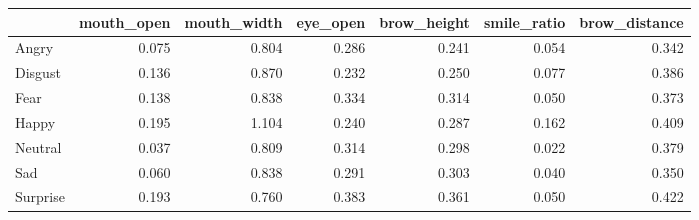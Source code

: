 \begin{tabular}{lrrrrrr}
\toprule
 & mouth_open & mouth_width & eye_open & brow_height & smile_ratio & brow_distance \\
\midrule
Angry & 0.075 & 0.804 & 0.286 & 0.241 & 0.054 & 0.342 \\
Disgust & 0.136 & 0.870 & 0.232 & 0.250 & 0.077 & 0.386 \\
Fear & 0.138 & 0.838 & 0.334 & 0.314 & 0.050 & 0.373 \\
Happy & 0.195 & 1.104 & 0.240 & 0.287 & 0.162 & 0.409 \\
Neutral & 0.037 & 0.809 & 0.314 & 0.298 & 0.022 & 0.379 \\
Sad & 0.060 & 0.838 & 0.291 & 0.303 & 0.040 & 0.350 \\
Surprise & 0.193 & 0.760 & 0.383 & 0.361 & 0.050 & 0.422 \\
\bottomrule
\end{tabular}

